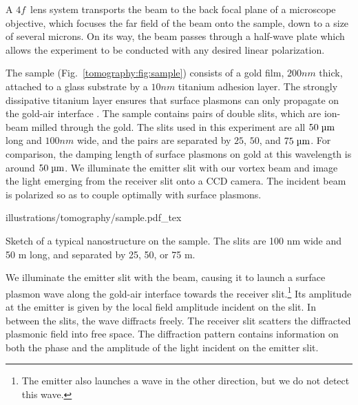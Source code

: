A $4f$\ lens system transports the beam to the back focal plane of a microscope objective, which focuses the far field of the beam onto the sample, down to a size of several microns. On its way, the beam passes through a half-wave plate which allows the experiment to be conducted with any desired linear polarization.

The sample (Fig.~\ref{tomography:fig:sample}) consists of a gold film, $200\unit{nm}$ thick, attached to a glass substrate by a $10\unit{nm}$ titanium adhesion layer.
The strongly dissipative titanium layer ensures that surface plasmons can only propagate on the gold-air interface \cite{Schouten2005}. The sample contains pairs of double slits, which are ion-beam milled through the gold. The slits used in this experiment are all $50\micron$ long and $100\unit{nm}$ wide, and the pairs are separated by $25$, $50$, and $75\micron$. For comparison, the damping length of surface plasmons on gold at this wavelength is around $50\micron$. We illuminate the emitter slit with our vortex beam and image the light emerging from the receiver slit onto a \gls{CCD} camera. The incident beam is polarized so as to couple optimally with surface plasmons.%
%
\begin{marginfigure}
\forcerectofloat
{illustrations/tomography/sample.pdf_tex}
\caption{Sketch of a typical nanostructure on the sample.
The slits are 100 nm wide and 50 \textmu m long, and separated by 25, 50, or 75 \textmu m.}
\label{tomography:fig:sample}
\end{marginfigure}

We illuminate the emitter slit with the beam, causing it to launch a surface plasmon wave along the gold-air interface towards the receiver slit.\footnote{The emitter also launches a wave in the other direction, but we do not detect this wave.}
Its amplitude at the emitter is given by the local field amplitude incident on the slit. In between the slits, the wave diffracts freely. The receiver slit scatters the diffracted plasmonic field into free space.
The diffraction pattern contains information on both the phase and the amplitude of the light incident on the emitter slit.

